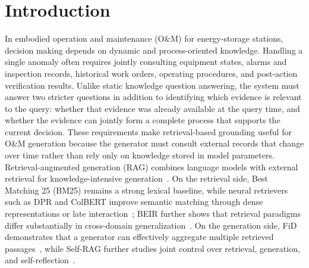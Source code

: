 \section{Introduction}
\label{sec:introduction}
%
In embodied operation and maintenance (O\&M) for energy-storage stations, decision making depends on dynamic and process-oriented knowledge. Handling a single anomaly often requires jointly consulting equipment states, alarms and inspection records, historical work orders, operating procedures, and post-action verification results. Unlike static knowledge question answering, the system must answer two stricter questions in addition to identifying which evidence is relevant to the query: whether that evidence was already available at the query time, and whether the evidence can jointly form a complete process that supports the current decision.
These requirements make retrieval-based grounding useful for O\&M generation because the generator must consult external records that change over time rather than rely only on knowledge stored in model parameters.
Retrieval-augmented generation (RAG) combines language models with external retrieval for knowledge-intensive generation~\cite{lewis2020rag}. On the retrieval side, Best Matching 25 (BM25) remains a strong lexical baseline, while neural retrievers such as DPR and ColBERT improve semantic matching through dense representations or late interaction~\cite{karpukhin2020dpr,khattab2020colbert}; BEIR further shows that retrieval paradigms differ substantially in cross-domain generalization~\cite{thakur2021beir}. On the generation side, FiD demonstrates that a generator can effectively aggregate multiple retrieved passages~\cite{izacard2021fid}, while Self-RAG further studies joint control over retrieval, generation, and self-reflection~\cite{asai2024selfrag}.
